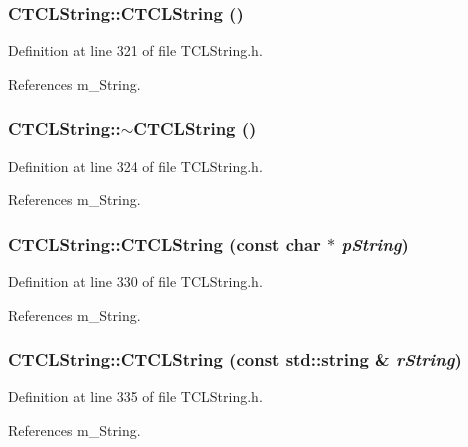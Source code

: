 \subsubsection{\setlength{\rightskip}{0pt plus 5cm}CTCLString::CTCLString ()\hspace{0.3cm}{\tt  [inline]}}\label{classCTCLString_a0}




Definition at line 321 of file TCLString.h.

References m\_\-String.
\subsubsection{\setlength{\rightskip}{0pt plus 5cm}CTCLString::$\sim$CTCLString ()\hspace{0.3cm}{\tt  [inline]}}\label{classCTCLString_a1}




Definition at line 324 of file TCLString.h.

References m\_\-String.
\subsubsection{\setlength{\rightskip}{0pt plus 5cm}CTCLString::CTCLString (const char $\ast$ {\em p\-String})\hspace{0.3cm}{\tt  [inline]}}\label{classCTCLString_a2}




Definition at line 330 of file TCLString.h.

References m\_\-String.
\subsubsection{\setlength{\rightskip}{0pt plus 5cm}CTCLString::CTCLString (const std::string \& {\em r\-String})\hspace{0.3cm}{\tt  [inline]}}\label{classCTCLString_a3}




Definition at line 335 of file TCLString.h.

References m\_\-String.
